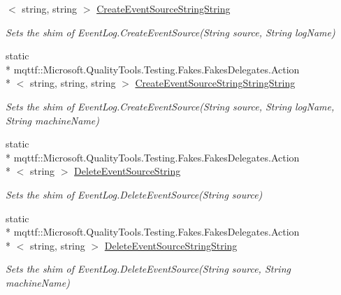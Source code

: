 \begin{DoxyCompactItemize}
$<$ string, string $>$ \hyperlink{class_system_1_1_diagnostics_1_1_fakes_1_1_shim_event_log_a6e2cddb433c8f1827db2bedbdf368fd0}{Create\-Event\-Source\-String\-String}
\begin{DoxyCompactList}\small\item\em Sets the shim of Event\-Log.\-Create\-Event\-Source(\-String source, String log\-Name)\end{DoxyCompactList}\item 
static \\*
mqttf\-::\-Microsoft.\-Quality\-Tools.\-Testing.\-Fakes.\-Fakes\-Delegates.\-Action\\*
$<$ string, string, string $>$ \hyperlink{class_system_1_1_diagnostics_1_1_fakes_1_1_shim_event_log_a27f06400f6420b4033f5402daab7c63f}{Create\-Event\-Source\-String\-String\-String}
\begin{DoxyCompactList}\small\item\em Sets the shim of Event\-Log.\-Create\-Event\-Source(\-String source, String log\-Name, String machine\-Name)\end{DoxyCompactList}\item 
static \\*
mqttf\-::\-Microsoft.\-Quality\-Tools.\-Testing.\-Fakes.\-Fakes\-Delegates.\-Action\\*
$<$ string $>$ \hyperlink{class_system_1_1_diagnostics_1_1_fakes_1_1_shim_event_log_a25ea5f834f866d0371dc57cc7c4d5370}{Delete\-Event\-Source\-String}
\begin{DoxyCompactList}\small\item\em Sets the shim of Event\-Log.\-Delete\-Event\-Source(\-String source)\end{DoxyCompactList}\item 
static \\*
mqttf\-::\-Microsoft.\-Quality\-Tools.\-Testing.\-Fakes.\-Fakes\-Delegates.\-Action\\*
$<$ string, string $>$ \hyperlink{class_system_1_1_diagnostics_1_1_fakes_1_1_shim_event_log_a63d3dc15f3f7f951a24433fd3aa87c37}{Delete\-Event\-Source\-String\-String}
\begin{DoxyCompactList}\small\item\em Sets the shim of Event\-Log.\-Delete\-Event\-Source(\-String source, String machine\-Name)\end{DoxyCompactList}\item 

\end{DoxyCompactItemize}

